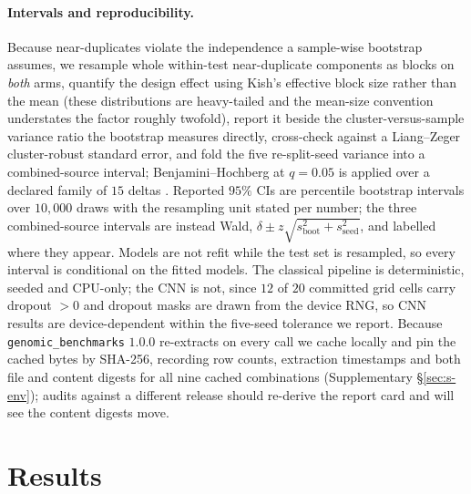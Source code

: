 \documentclass[webpdf,modern,large,namedate]{oup-authoring-template}%
\begin{document}
\paragraph{Intervals and reproducibility.} Because near-duplicates violate the independence a sample-wise bootstrap assumes, we resample whole within-test near-duplicate components as blocks on \emph{both} arms, quantify the design effect using Kish's effective block size rather than the mean (these distributions are heavy-tailed and the mean-size convention understates the factor roughly twofold), report it beside the cluster-versus-sample variance ratio the bootstrap measures directly, cross-check against a Liang--Zeger cluster-robust standard error, and fold the five re-split-seed variance into a combined-source interval; Benjamini--Hochberg at $q=0.05$ is applied over a declared family of $15$ deltas \citep{benjamini1995fdr}. Reported $95\%$ CIs are percentile bootstrap intervals over $10{,}000$ draws with the resampling unit stated per number; the three combined-source intervals are instead Wald, $\delta\pm z\sqrt{s^{2}_{\mathrm{boot}}+s^{2}_{\mathrm{seed}}}$, and labelled where they appear. Models are not refit while the test set is resampled, so every interval is conditional on the fitted models. The classical pipeline is deterministic, seeded and CPU-only; the CNN is not, since $12$ of $20$ committed grid cells carry dropout $>0$ and dropout masks are drawn from the device RNG, so CNN results are device-dependent within the five-seed tolerance we report. Because \texttt{genomic\_benchmarks} $1.0.0$ re-extracts on every call we cache locally and pin the cached bytes by SHA-256, recording row counts, extraction timestamps and both file and content digests for all nine cached combinations (Supplementary \S\ref{sec:s-env}); audits against a different release should re-derive the report card and will see the content digests move.

\section{Results}\label{sec:results}
\end{document}
